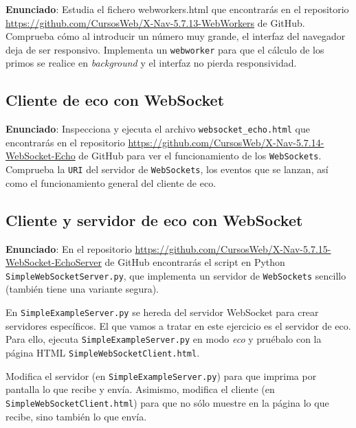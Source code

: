 \textbf{Enunciado}: Estudia el fichero webworkers.html que encontrarás en el repositorio \url{https://github.com/CursosWeb/X-Nav-5.7.13-WebWorkers} de GitHub. Comprueba cómo al introducir un número muy grande, el interfaz del navegador deja de ser responsivo. Implementa un \texttt{webworker} para que el cálculo de los primos se realice en \emph{background} y el interfaz no pierda responsividad.

\subsection{Cliente de eco con WebSocket}
\label{subsec:websocket-cliente-eco}

\textbf{Enunciado}: Inspecciona y ejecuta el archivo \texttt{websocket\_echo.html} que encontrarás en el repositorio \url{https://github.com/CursosWeb/X-Nav-5.7.14-WebSocket-Echo} de GitHub para ver el funcionamiento de los \texttt{WebSockets}. Comprueba la \texttt{URI} del servidor de \texttt{WebSockets}, los eventos que se lanzan, así como el funcionamiento general del cliente de eco.


\subsection{Cliente y servidor de eco con WebSocket}
\label{subsec:websocket-cliente-servidor-eco}

\textbf{Enunciado}: En el repositorio \url{https://github.com/CursosWeb/X-Nav-5.7.15-WebSocket-EchoServer} de GitHub encontrarás el script en Python \texttt{SimpleWebSocketServer.py}, que implementa un servidor de \texttt{WebSockets} sencillo (también tiene una variante segura). 

En \texttt{SimpleExampleServer.py} se hereda del servidor WebSocket para crear servidores específicos. El que vamos a tratar en este ejercicio es el servidor de eco. Para ello, ejecuta \texttt{SimpleExampleServer.py} en modo \emph{eco} y pruébalo con la página HTML \texttt{SimpleWebSocketClient.html}.

Modifica el servidor (en \texttt{SimpleExampleServer.py}) para que imprima por pantalla lo que recibe y envía. Asimismo, modifica el cliente (en \texttt{SimpleWebSocketClient.html}) para que no sólo muestre en la página lo que recibe, sino también lo que envía.


